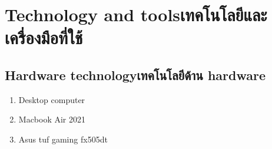 \section{\ifenglish Technology and tools\else เทคโนโลยีและเครื่องมือที่ใช้\fi}

\subsection{\ifenglish Hardware technology\else เทคโนโลยีด้าน hardware\fi}
\begin{enumerate}
    \item Desktop computer
    \item Macbook Air 2021
    \item Asus tuf gaming fx505dt
\end{enumerate}

